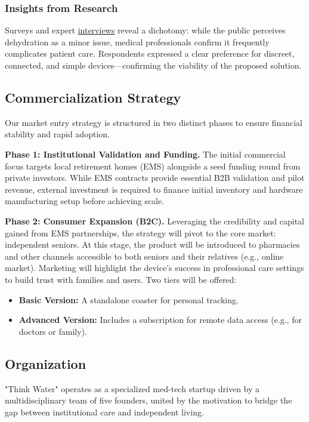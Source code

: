 \documentclass{article}
\begin{document}
\subsubsection{Insights from Research}
Surveys \cite{Poll} and expert \hyperref[appendix:interview]{interviews} reveal a dichotomy: while the public perceives dehydration as a minor issue, medical professionals confirm it frequently complicates patient care. Respondents expressed a clear preference for discreet, connected, and simple devices—confirming the viability of the proposed solution.

\subsection{Commercialization Strategy}
Our market entry strategy is structured in two distinct phases to ensure financial stability and rapid adoption.

\textbf{Phase 1: Institutional Validation and Funding.}
The initial commercial focus targets local retirement homes (EMS) alongside a seed funding round from private investors. While EMS contracts provide essential B2B validation and pilot revenue, external investment is required to finance initial inventory and hardware manufacturing setup before achieving scale.

\textbf{Phase 2: Consumer Expansion (B2C).}
Leveraging the credibility and capital gained from EMS partnerships, the strategy will pivot to the core market: independent seniors. At this stage, the product will be introduced to pharmacies and other channels accessible to both seniors and their relatives (e.g., online market). Marketing will highlight the device's success in professional care settings to build trust with families and users. Two tiers will be offered:
\begin{itemize}
    \item \textbf{Basic Version:} A standalone coaster for personal tracking.
    \item \textbf{Advanced Version:} Includes a subscription for remote data access (e.g., for doctors or family).
\end{itemize}
\subsection{Organization}

"Think Water" operates as a specialized med-tech startup driven by a multidisciplinary team of five founders, united by the motivation to bridge the gap between institutional care and independent living.
\end{document}
